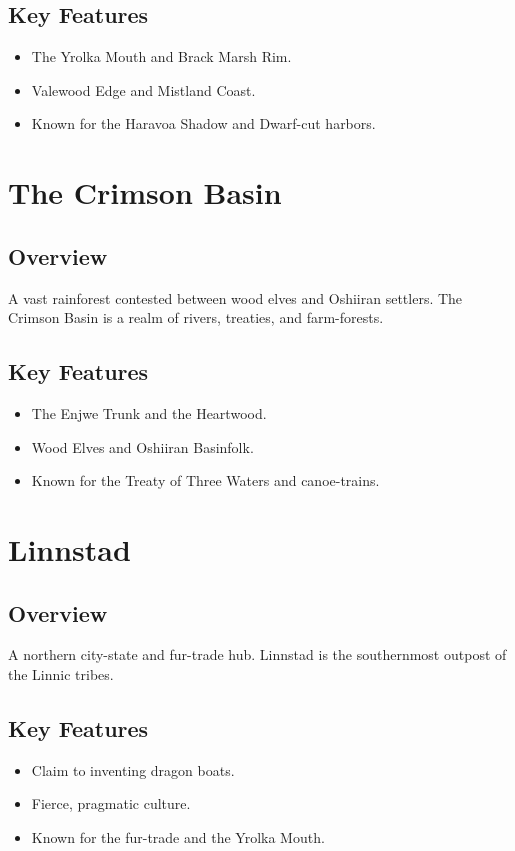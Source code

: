 \subsection*{Key Features}
\begin{itemize}[leftmargin=*]
    \item The Yrolka Mouth and Brack Marsh Rim.
    \item Valewood Edge and Mistland Coast.
    \item Known for the Haravoa Shadow and Dwarf-cut harbors.
\end{itemize}

\section{The Crimson Basin}
\label{sec:lore-crimson-basin}

\subsection*{Overview}
A vast rainforest contested between wood elves and Oshiiran settlers. The Crimson Basin is a realm of rivers, treaties, and farm-forests.

\subsection*{Key Features}
\begin{itemize}[leftmargin=*]
    \item The Enjwe Trunk and the Heartwood.
    \item Wood Elves and Oshiiran Basinfolk.
    \item Known for the Treaty of Three Waters and canoe-trains.
\end{itemize}

\section{Linnstad}
\label{sec:lore-linnstad}

\subsection*{Overview}
A northern city-state and fur-trade hub. Linnstad is the southernmost outpost of the Linnic tribes.

\subsection*{Key Features}
\begin{itemize}[leftmargin=*]
    \item Claim to inventing dragon boats.
    \item Fierce, pragmatic culture.
    \item Known for the fur-trade and the Yrolka Mouth.
\end{itemize}

